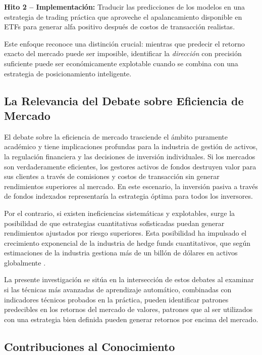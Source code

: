 \documentclass[11pt,a4paper]{article}
\begin{document}
\textbf{Hito 2 -- Implementación:} Traducir las predicciones de los modelos en una estrategia de trading práctica que aproveche el apalancamiento disponible en ETFs para generar alfa positivo después de costos de transacción realistas.

Este enfoque reconoce una distinción crucial: mientras que predecir el retorno exacto del mercado puede ser imposible, identificar la \textit{dirección} con precisión suficiente puede ser económicamente explotable cuando se combina con una estrategia de posicionamiento inteligente.

\subsection{La Relevancia del Debate sobre Eficiencia de Mercado}

El debate sobre la eficiencia de mercado trasciende el ámbito puramente académico y tiene implicaciones profundas para la industria de gestión de activos, la regulación financiera y las decisiones de inversión individuales. Si los mercados son verdaderamente eficientes, los gestores activos de fondos destruyen valor para sus clientes a través de comisiones y costos de transacción sin generar rendimientos superiores al mercado. En este escenario, la inversión pasiva a través de fondos indexados representaría la estrategia óptima para todos los inversores.

Por el contrario, si existen ineficiencias sistemáticas y explotables, surge la posibilidad de que estrategias cuantitativas sofisticadas puedan generar rendimientos ajustados por riesgo superiores. Esta posibilidad ha impulsado el crecimiento exponencial de la industria de hedge funds cuantitativos, que según estimaciones de la industria gestiona más de un billón de dólares en activos globalmente \citep{preqin2024}.

La presente investigación se sitúa en la intersección de estos debates al examinar si las técnicas más avanzadas de aprendizaje automático, combinadas con indicadores técnicos probados en la práctica, pueden identificar patrones predecibles en los retornos del mercado de valores, patrones que al ser utilizados con una estrategia bien definida pueden generar retornos por encima del mercado.

\subsection{Contribuciones al Conocimiento}
\end{document}
